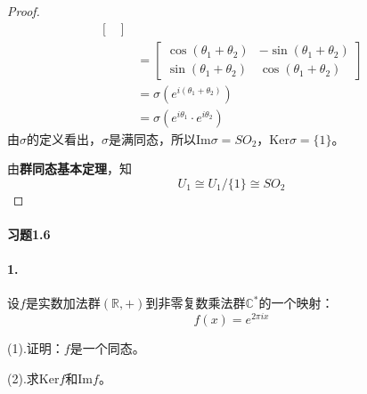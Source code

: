 \documentclass[12pt, a4paper, oneside]{ctexart}
\begin{document}
\begin{proof}
\begin{equation*}
\begin{aligned}
\begin{bmatrix}
            \end{bmatrix}\\
            &=\begin{bmatrix}
                \cos(\theta_1+\theta_2)&-\sin(\theta_1+\theta_2)\\
                \sin(\theta_1+\theta_2)&\cos(\theta_1+\theta_2)
            \end{bmatrix}\\
            &=\sigma(e^{i(\theta_1+\theta_2)})\\
            &=\sigma(e^{i\theta_1}\cdot e^{i\theta_2})
        \end{aligned}
    \end{equation*}
    由$\sigma$的定义看出，$\sigma$是满同态，所以$\text{Im}\sigma = SO_2$，$\text{Ker}\sigma = \{1\}$。

    由\textbf{群同态基本定理}，知
    \begin{equation*}
        U_1\cong U_1/\{1\}\cong SO_2
    \end{equation*}
\end{proof}
\paragraph{习题1.6}
\paragraph{1.}设$f$是实数加法群$(\mathbb R, +)$到非零复数乘法群$\mathbb C^*$的一个映射：
\begin{equation*}
    f(x)=e^{2\pi ix}
\end{equation*}

(1).证明：$f$是一个同态。

(2).求$\text{Ker}f$和$\text{Im}f$。
\end{document}
